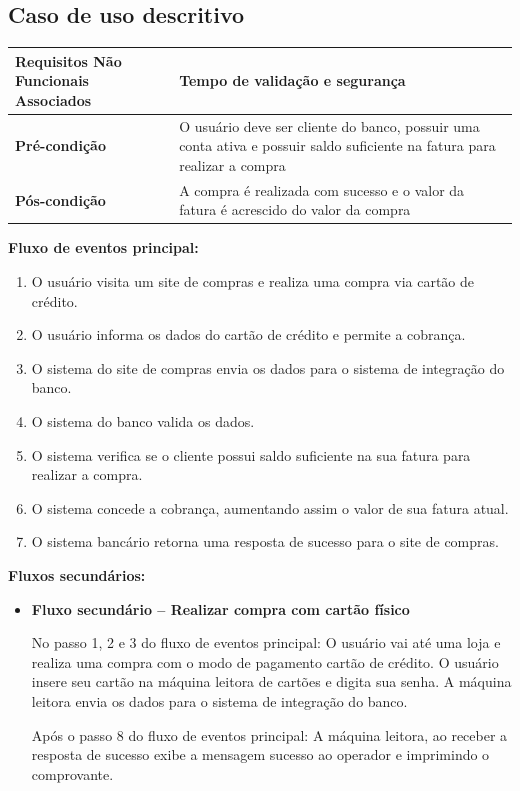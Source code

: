 \subsection{Caso de uso descritivo}

\begin{table}[h]
  \centering
  \begin{tabular}{|p{4cm} | p{10cm} |}
      \hline
      \small{\textbf{Requisitos Não Funcionais Associados}}	&	Tempo de validação e segurança	\\ \hline
      \small{\textbf{Pré-condição}}	&	O usuário deve ser cliente do banco, possuir uma conta ativa e possuir saldo suficiente na fatura para realizar a compra	\\ \hline
      \small{\textbf{Pós-condição}}	&	A compra é realizada com sucesso e o valor da fatura é acrescido do valor da compra	\\ \hline
    \end{tabular}
\end{table}

\textbf{Fluxo de eventos principal:}

\begin{enumerate}
  \item O usuário visita um site de compras e realiza uma compra via cartão de crédito.
  \item O usuário informa os dados do cartão de crédito e permite a cobrança.
  \item O sistema do site de compras envia os dados para o sistema de integração do banco.
  \item O sistema do banco valida os dados.
  \item O sistema verifica se o cliente possui saldo suficiente na sua fatura para realizar a compra.
  \item O sistema concede a cobrança, aumentando assim o valor de sua fatura atual.
  \item O sistema bancário retorna uma resposta de sucesso para o site de compras.
\end{enumerate}

\textbf{Fluxos secundários:}

\begin{itemize}
  \item \textbf{Fluxo secundário – Realizar compra com cartão físico}

  No passo 1, 2 e 3 do fluxo de eventos principal:
  \subitem O usuário vai até uma loja e realiza uma compra com o modo de pagamento cartão de crédito.
  \subitem O usuário insere seu cartão na máquina leitora de cartões e digita sua senha.
  \subitem A máquina leitora envia os dados para o sistema de integração do banco.

  Após o passo 8 do fluxo de eventos principal:
  \subitem A máquina leitora, ao receber a resposta de sucesso exibe a mensagem sucesso ao operador e imprimindo o comprovante.
\end{itemize}

